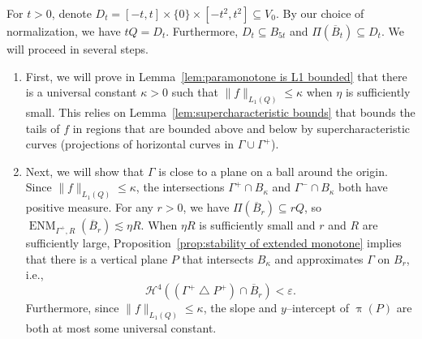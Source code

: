 \documentclass[11pt,reqno]{amsart}
\newcommand{\cH}{\mathcal{H}}
\renewcommand{\epsilon}{\varepsilon}
\newcommand{\0}{\mathbf{0}}
\renewcommand{\1}{\mathbf 1}
\newcommand{\symdiff}{\mathbin{\triangle}}
\renewcommand{\subset}{\subseteq}
\renewcommand{\le}{\leqslant}
\theoremstyle{remark}
\DeclareMathOperator{\ENM}{ENM}
\begin{document}
For $t>0$, denote  $D_t=[-t,t]\times\{0\}\times  [-t^2,t^2]\subset V_0$.  By our choice of normalization, we have $tQ=D_t$.  Furthermore, $D_t\subset B_{5t}$ and $\Pi(\overline{B}_{t})\subset D_t$. We will proceed in several steps.
\begin{enumerate}
\item
  First, we will prove in Lemma~\ref{lem:paramonotone is L1 bounded} that there is a universal constant $\kappa>0$ such that $\|f\|_{L_1(Q)}\le \kappa$ when $\eta$ is sufficiently small.  This relies on Lemma~\ref{lem:supercharacteristic bounds} that bounds the tails of $f$ in regions that are bounded above and below by supercharacteristic curves (projections of horizontal curves in $\Gamma\cup \Gamma^+$).
\item
  Next, we will show that $\Gamma$ is close to a plane on a ball around the origin.  Since $\|f\|_{L_1(Q)}\le \kappa$, the intersections $\Gamma^+\cap B_{\kappa}$ and $\Gamma^-\cap B_{\kappa}$ both have positive measure.  For any $r>0$, we have $\Pi(\overline{B}_{r})\subset rQ$, so $\ENM_{\Gamma^+,R}(\overline{B}_{r})\lesssim \eta R$.  When $\eta R$ is sufficiently small and $r$ and $R$ are sufficiently large, Proposition~\ref{prop:stability of extended monotone} implies that there is a vertical plane $P$ that intersects $B_{\kappa}$ and approximates $\Gamma$ on $B_r$, i.e.,
  $$\cH^4\left((\Gamma^+\symdiff P^+)\cap \overline{B}_{r}\right)<\epsilon.$$
  Furthermore, since $\|f\|_{L_1(Q)}\le \kappa$, the slope and $y$--intercept of $\uppi(P)$ are both at most some universal constant.


\end{enumerate}
\end{document}
